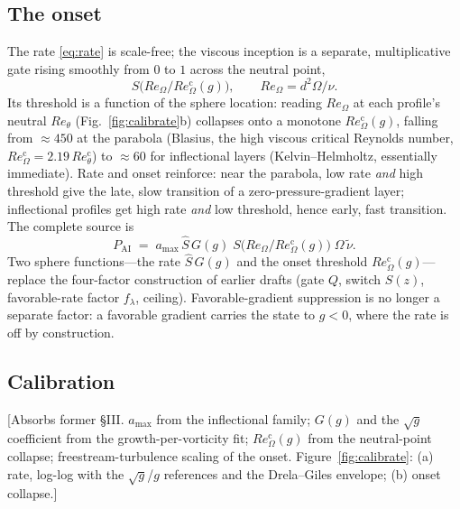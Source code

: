 \subsection{The onset}\label{sec:onset}
The rate \eqref{eq:rate} is scale-free; the viscous inception is a separate,
multiplicative gate rising smoothly from $0$ to $1$ across the neutral point,
\begin{equation}
  S\!\big(Re_\Omega / Re_\Omega^{\mathrm c}(g)\big),
  \qquad Re_\Omega = d^2\Omega/\nu .
  \label{eq:onset}
\end{equation}
Its threshold is a function of the sphere location: reading $Re_\Omega$ at each
profile's neutral $Re_\theta$ (Fig.~\ref{fig:calibrate}b) collapses onto a
monotone $Re_\Omega^{\mathrm c}(g)$, falling from $\approx\!450$ at the
parabola (Blasius, the high viscous critical Reynolds number,
$Re_\Omega^{\mathrm c}\!=\!2.19\,Re_\theta^{\mathrm c}$) to $\approx\!60$ for
inflectional layers (Kelvin--Helmholtz, essentially immediate). Rate and onset
reinforce: near the parabola, low rate \emph{and} high threshold give the late,
slow transition of a zero-pressure-gradient layer; inflectional profiles get
high rate \emph{and} low threshold, hence early, fast transition. The complete
source is
\begin{equation}
  P_{\mathrm{AI}} \;=\; a_{\max}\,\hat S\,G(g)\;
  S\!\big(Re_\Omega/Re_\Omega^{\mathrm c}(g)\big)\;\Omega\,\tilde\nu .
  \label{eq:pai}
\end{equation}
Two sphere functions---the rate $\hat S\,G(g)$ and the onset threshold
$Re_\Omega^{\mathrm c}(g)$---replace the four-factor construction of earlier
drafts (gate $Q$, switch $S(z)$, favorable-rate factor $f_\lambda$, ceiling).
Favorable-gradient suppression is no longer a separate factor: a favorable
gradient carries the state to $g<0$, where the rate is off by construction.

\subsection{Calibration}\label{sec:calib}
[Absorbs former \S III. $a_{\max}$ from the inflectional family; $G(g)$ and the
$\sqrt g$ coefficient from the growth-per-vorticity fit; $Re_\Omega^{\mathrm
c}(g)$ from the neutral-point collapse; freestream-turbulence scaling of the
onset. Figure~\ref{fig:calibrate}: (a) rate, log-log with the $\sqrt g$/$g$
references and the Drela--Giles envelope; (b) onset collapse.]
